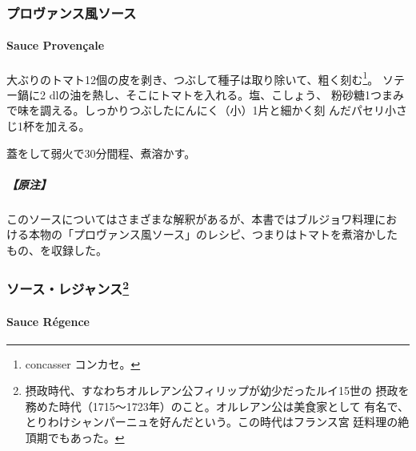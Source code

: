 \maeaki

\hypertarget{ux30d7ux30edux30f4ux30a1ux30f3ux30b9ux98a8ux30bdux30fcux30b9}{%
\subsubsection{プロヴァンス風ソース}\label{ux30d7ux30edux30f4ux30a1ux30f3ux30b9ux98a8ux30bdux30fcux30b9}}

\hypertarget{sauce-provencal}{%
\paragraph{Sauce Provençale}\label{sauce-provencal}}

 

大ぶりのトマト12個の皮を剥き、つぶして種子は取り除いて、粗く刻む\footnote{concasser
  コンカセ。}。 ソテー鍋に2\undemi{}
dlの油を熱し、そこにトマトを入れる。塩、こしょう、
粉砂糖1つまみで味を調える。しっかりつぶしたにんにく（小）1片と細かく刻
んだパセリ小さじ1杯を加える。

蓋をして弱火で30分間程、煮溶かす。

\hypertarget{ux539fux6ce8-7}{%
\subparagraph{【原注】}\label{ux539fux6ce8-7}}

このソースについてはさまざまな解釈があるが、本書ではブルジョワ料理にお
ける本物の「プロヴァンス風ソース」のレシピ、つまりはトマトを煮溶かした
もの、を収録した。

\maeaki

\hypertarget{ux30bdux30fcux30b9ux30ecux30b8ux30e3ux30f3ux30b975}{%
\subsubsection[ソース・レジャンス]{\texorpdfstring{ソース・レジャンス\footnote{摂政時代、すなわちオルレアン公フィリップが幼少だったルイ15世の
  摂政を務めた時代（1715〜1723年）のこと。オルレアン公は美食家として
  有名で、とりわけシャンパーニュを好んだという。この時代はフランス宮
  廷料理の絶頂期でもあった。}}{ソース・レジャンス}}\label{ux30bdux30fcux30b9ux30ecux30b8ux30e3ux30f3ux30b975}}

\hypertarget{sauce-regence}{%
\paragraph{Sauce Régence}\label{sauce-regence}}

